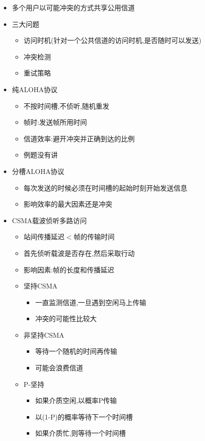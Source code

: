 \documentclass[a4paper,12pt,notitlepage]{article}
\begin{document}
\begin{itemize}
\begin{itemize}
		\item 多个用户以可能冲突的方式共享公用信道
		\item 三大问题
		\begin{itemize}
			\item 访问时机(针对一个公共信道的访问时机,是否随时可以发送)
			\item 冲突检测
			\item 重试策略
		\end{itemize}
		\item 纯ALOHA协议
		\begin{itemize}
			\item 不按时间槽,不侦听,随机重发
			\item 帧时:发送帧所用时间
			\item 信道效率:避开冲突并正确到达的比例
			\item 例题没有讲
		\end{itemize}
		\item 分槽ALOHA协议
		\begin{itemize}
			\item 每次发送的时候必须在时间槽的起始时刻开始发送信息
			\item 影响效率的最大因素还是冲突
		\end{itemize}
		\item CSMA载波侦听多路访问
		\begin{itemize}
			\item 站间传播延迟$<$帧的传输时间
			\item 首先侦听载波是否存在,然后采取行动
			\item 影响因素:帧的长度和传播延迟
			\item 坚持CSMA
			\begin{itemize}
				\item 一直监测信道,一旦遇到空闲马上传输
				\item 冲突的可能性比较大
			\end{itemize}
			\item 非坚持CSMA
			\begin{itemize}
				\item 等待一个随机的时间再传输
				\item 可能会浪费信道
			\end{itemize}
			\item P-坚持
			\begin{itemize}
				\item 如果介质空闲,以概率P传输
				\item 以(1-P)的概率等待下一个时间槽
				\item 如果介质忙,则等待一个时间槽

\end{itemize}
\end{itemize}
\end{itemize}
\end{itemize}
\end{document}
